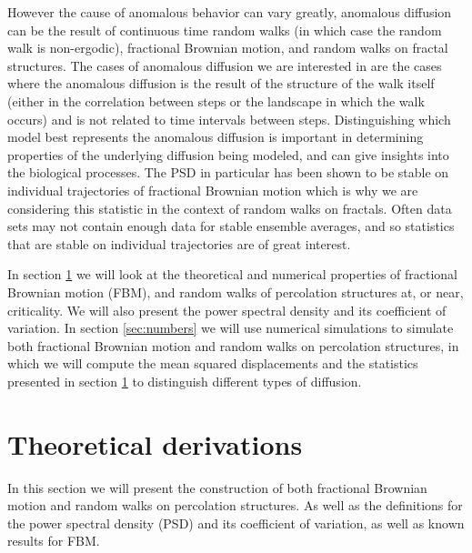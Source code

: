 \documentclass[%
 reprint,
 amsmath,amssymb,
 aps,
]{revtex4-2}
\begin{document}
However the cause of anomalous behavior can vary greatly, anomalous diffusion can be the result of continuous time random walks (in which case the random walk is non-ergodic), fractional Brownian motion, and random walks on fractal structures\cite{weigel_ergodic_2011, meroz_subdiffusion_2010}. The cases of anomalous diffusion we are interested in are the cases where the anomalous diffusion is the result of the structure of the walk itself (either in the correlation between steps or the landscape in which the walk occurs) and is not related to time intervals between steps. Distinguishing which model best represents the anomalous diffusion is important in determining properties of the underlying diffusion being modeled, and can give insights into the biological processes. The PSD in particular has been shown to be stable on individual trajectories of fractional Brownian motion which is why we are considering this statistic in the context of random walks on fractals\cite{krapf_spectral_2019}. Often data sets may not contain enough data for stable ensemble averages, and so statistics that are stable on individual trajectories are of great interest.

In section \ref{sec:theory} we will look at the theoretical and numerical properties of fractional Brownian motion (FBM), and random walks of percolation structures at, or near, criticality. We will also present the power spectral density and its coefficient of variation. In section \ref{sec:numbers} we will use numerical simulations to simulate both fractional Brownian motion and random walks on percolation structures, in which we will compute the mean squared displacements and the statistics presented in section \ref{sec:theory} to distinguish different types of diffusion.
\section{Theoretical derivations}
\label{sec:theory}
In this section we will present the construction of both fractional Brownian motion and random walks on percolation structures. As well as the definitions for the power spectral density (PSD) and its coefficient of variation, as well as known results for FBM.
\end{document}

